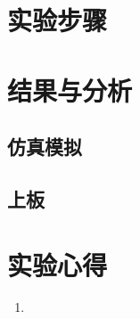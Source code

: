 \documentclass[12pt,UTF8]{ctexart}
\begin{document}
\begin{spacing}{1.1}
\section{实验步骤}



\section{结果与分析}
\subsection{仿真模拟}

\subsection{上板}

\section{实验心得}
\begin{enumerate}
	\item 
\end{enumerate}



\end{spacing}
\end{document}
